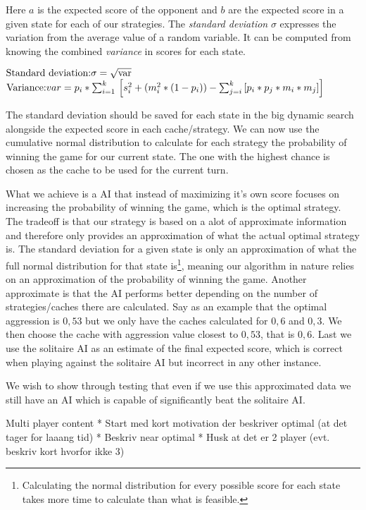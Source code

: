 Here $a$ is the expected score of the opponent and $b$ are the expected score in a given state for each of our strategies. The \emph{standard deviation} $\sigma$ expresses the variation from the average value of a random variable. It can be computed from knowing the combined \emph{variance} in scores for each state. 

$\newline\mbox{Standard deviation:} \newline \sigma = \sqrt{\mbox{var}} $
$\newline \mbox{Variance:} \newline var = p_i * \sum_{i=1}^{k} \newline\left[s_i^2 + (m_i^2 * (1 - p_i)) - \sum_{j=i}^{k} \left[p_i * p_j * m_i * m_j\right]\right]$\newline

The standard deviation should be saved for each state in the big dynamic search alongside the expected score in each cache/strategy. We can now use the cumulative normal distribution to calculate for each strategy the probability of winning the game for our current state. The one with the highest chance is chosen as the cache to be used for the current turn.

What we achieve is a AI that instead of maximizing it's own score focuses on increasing the probability of winning the game, which is the optimal strategy. The tradeoff is that our strategy is based on a alot of approximate information and therefore only provides an approximation of what the actual optimal strategy is. The standard deviation for a given state is only an approximation of what the full normal distribution for that state is\footnote{Calculating the normal distribution for every possible score for each state takes more time to calculate than what is feasible.}, meaning our algorithm in nature relies on an approximation of the probability of winning the game. Another approximate is that the AI performs better depending on the number of strategies/caches there are calculated. Say as an example that the optimal aggression is $0,53$ but we only have the caches calculated for $0,6$ and $0,3$. We then choose the cache with aggression value closest to $0,53$, that is $0,6$. Last we use the solitaire AI as an estimate of the final expected score, which is correct when playing against the solitaire AI but incorrect in any other instance.

We wish to show through testing that even if we use this approximated data we still have an AI which is capable of significantly beat the solitaire AI.

Multi player content
* Start med kort motivation der beskriver optimal (at det tager for laaang tid)
* Beskriv near optimal
* Husk at det er 2 player (evt. beskriv kort hvorfor ikke 3)
